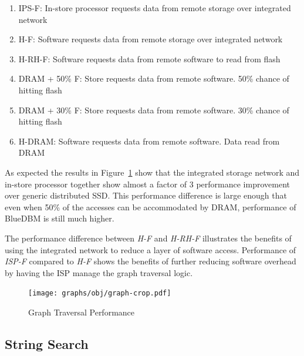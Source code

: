 \begin{enumerate}
\item IPS-F:  In-store processor requests data from remote storage over integrated network
\item H-F:  Software requests data from remote storage over integrated network 
\item H-RH-F:  Software requests data from remote software to read from flash
\item DRAM + 50\% F:  Store requests data from remote software. 50\% chance of hitting flash
\item DRAM + 30\% F:  Store requests data from remote software. 30\% chance of hitting flash
\item H-DRAM:  Software requests data from remote software. Data read from DRAM 
\end{enumerate}

As expected the results in Figure~\ref{fig:result_graph} show that the integrated storage network and in-store processor together show almost a factor of 3 performance improvement over generic distributed SSD. This performance difference is large enough that even when 50\% of the accesses can be accommodated by DRAM, performance of BlueDBM is still much higher.

The performance difference between \emph{H-F} and \emph{H-RH-F} illustrates the benefits of using the integrated network to reduce a layer of software access. Performance of \emph{ISP-F} compared to \emph{H-F} shows the benefits of further reducing software overhead by having the ISP manage the graph traversal logic. 
	
\begin{figure}[t]
	\centering
	\texttt{[image: graphs/obj/graph-crop.pdf]}
	\caption{Graph Traversal Performance}
	\label{fig:result_graph}
\end{figure}

%

\subsection{String Search}

